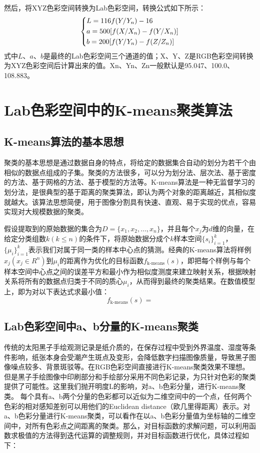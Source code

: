 \documentclass[UTF8,a4paper,twoside]{ctexart}
\begin{document}
然后，将XYZ色彩空间转换为Lab色彩空间，转换公式如下所示：
\begin{equation}
  \left\{
    \begin{lgathered}
      L = 116 f(Y/Y_n) - 16 \\
      a = 500[f(X/X_n) - f(Y/X_n)] \\
      b = 200[f(Y/Y_n) - f(Z/Z_n)]
    \end{lgathered}
  \right.
\end{equation}
式中$L$、$a$、$b$是最终的Lab色彩空间三个通道的值；X、Y、Z是RGB色彩空间转换为XYZ色彩空间后计算出来的值。Xn、Yn、Zn一般默认是95.047、100.0、108.883。

\section{Lab色彩空间中的K-means聚类算法}
\subsection{K-means算法的基本思想}
聚类的基本思想是通过数据自身的特点，将给定的数据集合自动的划分为若干个由相似的数据点组成的子集。聚类的方法很多，可以分为划分法、层次法、基于密度的方法、基于网格的方法、基于模型的方法等。K-means算法\cite{蒋帅2010k,吴晓蓉2008k}是一种无监督学习的划分法，是很典型的基于距离的聚类算法，即认为两个对象的距离越近，其相似度就越大。该算法思想简便，用于图像分割具有快速、直观、易于实现的优点，容易实现对大规模数据的聚类。

假设提取到的原始数据的集合为$D = \{x_1, x_2, \ldots, x_n\}$，并且每个$x_j$为$d$维的向量，在给定分类组数$k(k\leq n)$的条件下，将原始数据分成个$k$样本空间$\{s_i\}^k_{i=1}$，$\{\mu_i\}^k_{i=1}$表示我们对属于同一类的样本中心点的猜测。经典的K-means算法将样例$x_j(x_j \in R^n)$到$\mu_i$的距离作为优化的目标函数$f_{\text{k-means}}(s)$，即把每个样例与每个样本空间中心点之间的误差平方和最小作为相似度测度来建立映射关系，根据映射关系将所有的数据点归类于不同的质心$\mu_i$，从而得到最终的聚类结果。在数值模型上，即为对以下表达式求最小值：
\begin{equation}
  f_{\text{k-means}}(s) = 
\end{equation}
\subsection{Lab色彩空间中a、b分量的K-means聚类}
传统的太阳黑子手绘观测记录是纸介质的，在保存过程中受到外界温度、湿度等条件影响，纸张本身会受潮产生斑点及变形，会降低数字扫描图像质量，导致黑子图像噪点较多、背景斑驳等。在RGB色彩空间直接进行K-means聚类效果不理想。但是黑子手绘图像中印刷部分和手绘部分采用不同色彩记录，为只针对色彩的聚类提供了可能性。这里我们抛开明度L的影响，对a、b色彩分量，进行K-means聚类。
每个具有a、b两个分量的色彩都可以近似为二维空间中的一个点，任何两个色彩的相对感知差别可以用他们的Euclidean distance（欧几里得距离）表示。对a、b色彩分量进行K-means聚类，可以看作在以a、b色彩分量值为坐标轴的二维空间中，对所有色彩点之间距离的聚类。那么，对目标函数的求解问题，可以利用函数求极值的方法得到迭代运算的调整规则，并对目标函数进行优化，具体过程如下：
\end{document}
